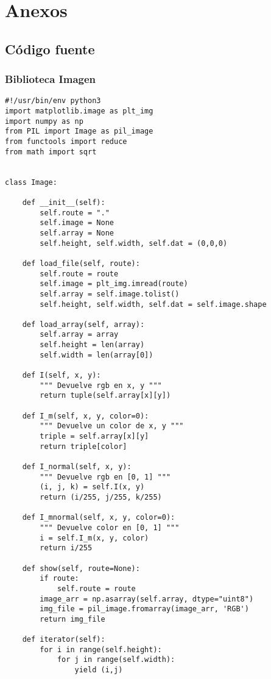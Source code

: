 \documentclass[letter]{article}
\begin{document}
\section{Anexos}
\label{sec:org60c45af}
\subsection{Código fuente}
\label{sec:org4fec46e}
\subsubsection{Biblioteca Imagen}
\label{sec:orgbc48177}
\begin{verbatim}
#!/usr/bin/env python3
import matplotlib.image as plt_img
import numpy as np
from PIL import Image as pil_image
from functools import reduce
from math import sqrt


class Image:

    def __init__(self):
        self.route = "."
        self.image = None
        self.array = None
        self.height, self.width, self.dat = (0,0,0)

    def load_file(self, route):
        self.route = route
        self.image = plt_img.imread(route)
        self.array = self.image.tolist()
        self.height, self.width, self.dat = self.image.shape

    def load_array(self, array):
        self.array = array
        self.height = len(array)
        self.width = len(array[0])

    def I(self, x, y):
        """ Devuelve rgb en x, y """
        return tuple(self.array[x][y])

    def I_m(self, x, y, color=0):
        """ Devuelve un color de x, y """
        triple = self.array[x][y]
        return triple[color]

    def I_normal(self, x, y):
        """ Devuelve rgb en [0, 1] """
        (i, j, k) = self.I(x, y)
        return (i/255, j/255, k/255)

    def I_mnormal(self, x, y, color=0):
        """ Devuelve color en [0, 1] """
        i = self.I_m(x, y, color)
        return i/255

    def show(self, route=None):
        if route:
            self.route = route
        image_arr = np.asarray(self.array, dtype="uint8")
        img_file = pil_image.fromarray(image_arr, 'RGB')
        return img_file

    def iterator(self):
        for i in range(self.height):
            for j in range(self.width):
                yield (i,j)


\end{verbatim}
\end{document}
